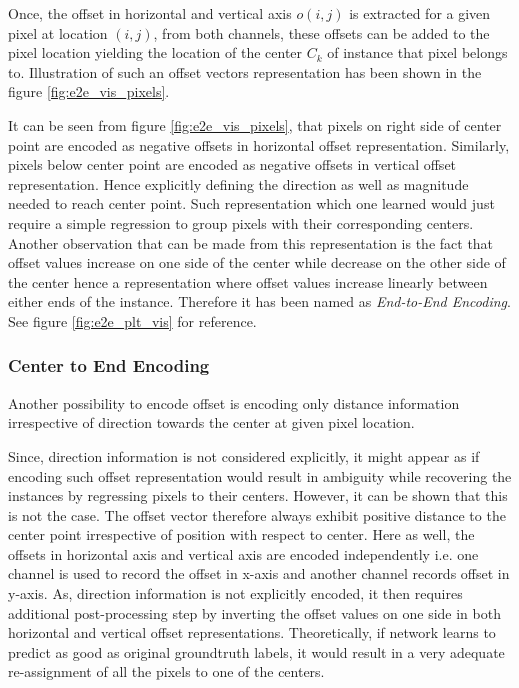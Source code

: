 Once, the offset in horizontal and vertical axis $o(i, j)$ is extracted for a given pixel at location $(i, j)$, from both channels, these offsets can be added to the pixel location yielding the location of the center  $C_{k}$ of instance that pixel belongs to. Illustration of such an offset vectors representation has been shown in the figure \ref{fig:e2e_vis_pixels}. 

It can be seen from figure \ref{fig:e2e_vis_pixels}, that pixels on right side of center point are encoded as negative offsets in horizontal offset representation. Similarly, pixels below center point are encoded as negative offsets in vertical offset representation. Hence explicitly defining the direction as well as magnitude needed to reach center point. Such representation which one learned would just require a simple regression to group pixels with their corresponding centers. Another observation that can be made from this representation is the fact that offset values increase on one side of the center while decrease on the other side of the center hence a representation where offset values increase linearly between either ends of the instance. Therefore it has been named as \textit{End-to-End Encoding}. See figure \ref{fig:e2e_plt_vis} for reference.

\subsubsection{Center to End Encoding}
\label{subsec:c2e}
Another possibility to encode offset is encoding only distance information irrespective of direction towards the center at given pixel location. 

Since, direction information is not considered explicitly, it might appear as if encoding such offset representation would result in ambiguity while recovering the instances by regressing pixels to their centers. However, it can be shown that this is not the case. The offset vector therefore always exhibit positive distance to the center point irrespective of position with respect to center.  Here as well, the offsets in horizontal axis and vertical axis are encoded independently i.e. one channel is used to record the offset in x-axis and another channel records offset in y-axis. 
As, direction information is not explicitly encoded, it then requires additional post-processing step by inverting the offset values on one side in both horizontal and vertical offset representations. Theoretically, if network learns to predict as good as original groundtruth labels, it would result in a very adequate re-assignment of all the pixels to one of the centers. 

